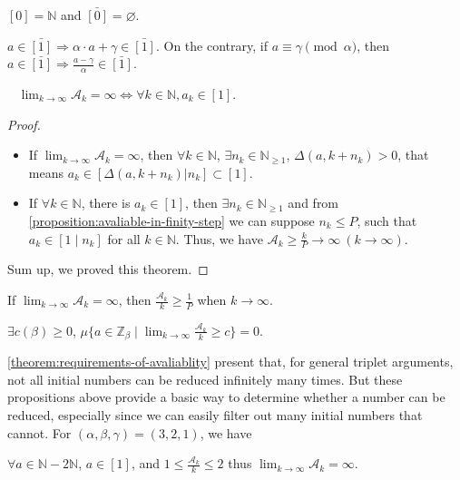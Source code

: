 \begin{proposition}
    $[0] = \mathbb{N}$ and $\bar{[0]} = \varnothing$.
\end{proposition}
\begin{proposition}
    $a \in \bar{[1]} \Longrightarrow \alpha \cdot a + \gamma \in \bar{[1]}$.
    On the contrary, if $a\equiv \gamma \pmod{\alpha}$, then $a \in \bar{[1]} \Longrightarrow \frac{a - \gamma}{\alpha} \in \bar{[1]}$.
\end{proposition}
\begin{theorem}~\label{theorem:requirements-of-avaliablity}
    $\lim_{k\to\infty} \mathcal{A}_k = \infty\Longleftrightarrow\forall k\in \mathbb{N}, a_k \in [1]$.
\end{theorem}
\begin{proof}
\begin{itemize}
    \item[$\Longrightarrow$)]
        If $\lim_{k\to\infty} \mathcal{A}_k = \infty$, then $\forall k \in \mathbb{N}$, $\exists n_{k} \in \mathbb{N}_{\ge1}$, $\Delta(a, k + n_{k}) > 0$,
        that means $a_{k} \in [\Delta(a, k + n_{k}) | n_{k}] \subset [1]$.
    \item[$\Longleftarrow$)] 
        If $\forall k \in \mathbb{N}$, there is $a_k \in [1]$, then $\exists n_{k} \in \mathbb{N}_{\ge1}$ and from \cref{proposition:avaliable-in-finity-step} we can suppose $n_k \le P$,
        such that $a_k \in [1 \mid n_{k}]$ for all $k \in \mathbb{N}$.
        Thus, we have $\mathcal{A}_k \ge \frac{k}{P} \to \infty\ (k \to \infty)$.
\end{itemize}
Sum up, we proved this theorem.
\end{proof}
\begin{corollary}
    If $\lim_{k\to\infty}\mathcal{A}_k = \infty$, then $\frac{\mathcal{A}_k}{k} \ge \frac{1}{P}$ when $k\to\infty$.
\end{corollary}
\begin{conjecture}
    $\exists c(\beta) \ge 0$, $\mu\{a \in\mathbb{Z}_{\beta} \mid \lim_{k\to\infty}\frac{\mathcal{A}_k}{k} \ge c \}  = 0$.
\end{conjecture}

\cref{theorem:requirements-of-avaliablity} present that, for general triplet arguments, not all initial numbers can be reduced infinitely many times.
But these propositions above provide a basic way to determine whether a number can be reduced, especially since we can easily filter out many initial numbers that cannot. For $(\alpha, \beta, \gamma) = (3, 2, 1)$, we have
\begin{corollary}
    $\forall a \in \mathbb{N} - 2\mathbb{N}$, $a\in[1]$, and $1 \le \frac{\mathcal{A}_k}{k} \le 2$ thus $\lim_{k\to\infty}\mathcal{A}_k = \infty$.
\end{corollary}


